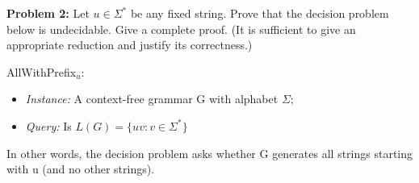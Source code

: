 
\noindent \textbf{Problem 2: } Let $u \in \Sigma^*$ be any fixed string. Prove that the decision problem below is undecidable. Give a
complete proof. (It is sufficient to give an appropriate reduction and justify its correctness.)

\vskip 0.1in

\noindent AllWithPrefix$_u$:

\begin{itemize}
    \item[] \textit{Instance:} A context-free grammar G with alphabet $\Sigma$;
    \item[] \textit{Query:} Is $L(G) = \{ uv : v \in \Sigma^* \}$
\end{itemize}

\noindent In other words, the decision problem asks whether G generates all strings starting with u (and no other
strings).